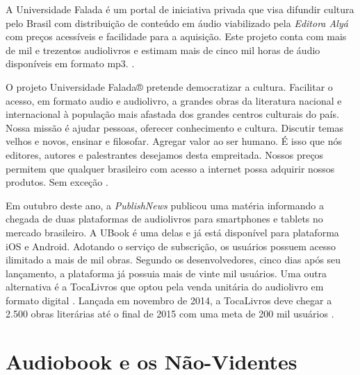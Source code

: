 A Universidade Falada é um portal de iniciativa privada que visa difundir cultura pelo Brasil com distribuição de conteúdo em áudio viabilizado pela \textit{Editora Alyá} com preços acessíveis e facilidade para a aquisição. Este projeto conta com mais de mil e trezentos audiolivros e estimam mais de cinco mil horas de áudio disponíveis em formato mp3. \cite{universidadefalada}.

\begin{citacao}
O projeto Universidade Falada® pretende democratizar a cultura. Facilitar o acesso, em formato audio e audiolivro, a grandes obras da literatura nacional e internacional à população mais afastada dos grandes centros culturais do país. Nossa missão é ajudar pessoas, oferecer conhecimento e cultura. Discutir temas velhos e novos, ensinar e filosofar. Agregar valor ao ser humano. É isso que nós editores, autores e palestrantes desejamos desta empreitada. Nossos preços permitem que qualquer brasileiro com acesso a internet possa adquirir nossos produtos. Sem exceção \cite{universidadefalada}.
\end{citacao}

Em outubro deste ano, a \textit{PublishNews} publicou uma matéria informando a chegada de duas plataformas de audiolivros para smartphones e tablets no mercado brasileiro. A UBook é uma delas e já está disponível para plataforma iOS e Android. Adotando o serviço de subscrição, os usuários possuem acesso ilimitado a mais de mil obras. Segundo os desenvolvedores, cinco dias após seu lançamento, a plataforma já possuia mais de vinte mil usuários. Uma outra alternativa é a TocaLivros que optou pela venda unitária do audiolivro em formato digital \cite{publishnews}. Lançada em novembro de 2014, a TocaLivros deve chegar a  2.500 obras literárias até o final de 2015 com uma meta de 200 mil usuários \cite{startupi}.

\section{Audiobook e os Não-Videntes}

